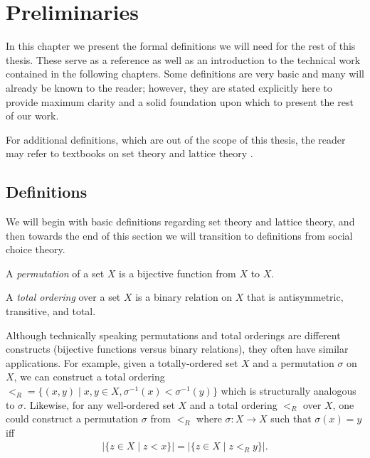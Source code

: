 
\chapter{Preliminaries}

	In this chapter we present the formal definitions we will need for the rest of this thesis. These serve as a reference as well as an introduction to the technical work contained in the following chapters. Some definitions are very basic and many will already be known to the reader; however, they are stated explicitly here to provide maximum clarity and a solid foundation upon which to present the rest of our work.

	For additional definitions, which are out of the scope of this thesis, the reader may refer to textbooks on set theory \cite{kunen1980set} and lattice theory \cite{birkhoff1995lattice}.

\section{Definitions}

	We will begin with basic definitions regarding set theory and lattice theory, and then towards the end of this section we will transition to definitions from social choice theory.

	\begin{definition}
		A \emph{permutation} of a set $X$ is a bijective function from $X$ to $X$.
	\end{definition}

	\begin{definition}
		A \emph{total ordering} over a set $X$ is a binary relation on $X$ that is antisymmetric, transitive, and total.
	\end{definition}

	Although technically speaking permutations and total orderings are different constructs (bijective functions versus binary relations), they often have similar applications. For example, given a totally-ordered set $X$ and a permutation $\sigma$ on $X$, we can construct a total ordering $<_R = \{(x,y) \mid x, y \in X, \sigma^{-1}(x) < \sigma^{-1}(y)\}$ which is structurally analogous to $\sigma$. Likewise, for any well-ordered set $X$ and a total ordering $<_R$ over $X$, one could construct a permutation $\sigma$ from $<_R$ where $\sigma : X \to X$ such that $\sigma(x) = y$ iff
	\begin{align*}
		|\{z \in X \mid z < x\}| = |\{z \in X \mid z <_R y\}|.
	\end{align*}

